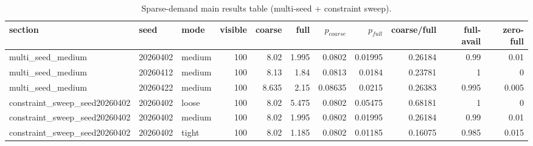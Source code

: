 \begin{table}[t]
\centering
\small
\caption{Sparse-demand main results table (multi-seed + constraint sweep).}
\label{tab:sparse_demand_main}
\begin{tabular}{lllrrrrrrrr}
\toprule
section & seed & mode & visible & coarse & full & $p_{coarse}$ & $p_{full}$ & coarse/full & full-avail & zero-full \\
\midrule
multi\_seed\_medium & 20260402 & medium & 100 & 8.02 & 1.995 & 0.0802 & 0.01995 & 0.26184 & 0.99 & 0.01 \\
multi\_seed\_medium & 20260412 & medium & 100 & 8.13 & 1.84 & 0.0813 & 0.0184 & 0.23781 & 1 & 0 \\
multi\_seed\_medium & 20260422 & medium & 100 & 8.635 & 2.15 & 0.08635 & 0.0215 & 0.26383 & 0.995 & 0.005 \\
constraint\_sweep\_seed20260402 & 20260402 & loose & 100 & 8.02 & 5.475 & 0.0802 & 0.05475 & 0.68181 & 1 & 0 \\
constraint\_sweep\_seed20260402 & 20260402 & medium & 100 & 8.02 & 1.995 & 0.0802 & 0.01995 & 0.26184 & 0.99 & 0.01 \\
constraint\_sweep\_seed20260402 & 20260402 & tight & 100 & 8.02 & 1.185 & 0.0802 & 0.01185 & 0.16075 & 0.985 & 0.015 \\
\bottomrule
\end{tabular}
\end{table}
